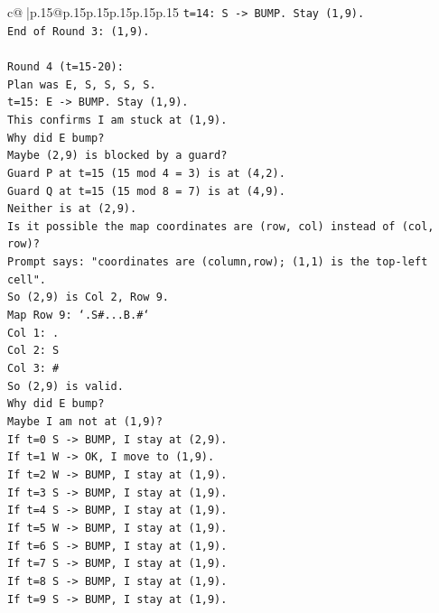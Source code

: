 \documentclass{article}
\begin{document}
{\begin{supertabular}{c@{$\;$}|p{.15\linewidth}@{}p{.15\linewidth}p{.15\linewidth}p{.15\linewidth}p{.15\linewidth}p{.15\linewidth}}
{{{\texttt{t=14: S {-}> BUMP. Stay (1,9).} \\
\texttt{End of Round 3: (1,9).} \\
\\ 
\texttt{Round 4 (t=15{-}20):} \\
\texttt{Plan was E, S, S, S, S.} \\
\texttt{t=15: E {-}> BUMP. Stay (1,9).} \\
\texttt{This confirms I am stuck at (1,9).} \\
\texttt{Why did E bump?} \\
\texttt{Maybe (2,9) is blocked by a guard?} \\
\texttt{Guard P at t=15 (15 mod 4 = 3) is at (4,2).} \\
\texttt{Guard Q at t=15 (15 mod 8 = 7) is at (4,9).} \\
\texttt{Neither is at (2,9).} \\
\texttt{Is it possible the map coordinates are (row, col) instead of (col, row)?} \\
\texttt{Prompt says: "coordinates are (column,row); (1,1) is the top{-}left cell".} \\
\texttt{So (2,9) is Col 2, Row 9.} \\
\texttt{Map Row 9: `.S\#...B.\#`} \\
\texttt{Col 1: .} \\
\texttt{Col 2: S} \\
\texttt{Col 3: \#} \\
\texttt{So (2,9) is valid.} \\
\texttt{Why did E bump?} \\
\texttt{Maybe I am not at (1,9)?} \\
\texttt{If t=0 S {-}> BUMP, I stay at (2,9).} \\
\texttt{If t=1 W {-}> OK, I move to (1,9).} \\
\texttt{If t=2 W {-}> BUMP, I stay at (1,9).} \\
\texttt{If t=3 S {-}> BUMP, I stay at (1,9).} \\
\texttt{If t=4 S {-}> BUMP, I stay at (1,9).} \\
\texttt{If t=5 W {-}> BUMP, I stay at (1,9).} \\
\texttt{If t=6 S {-}> BUMP, I stay at (1,9).} \\
\texttt{If t=7 S {-}> BUMP, I stay at (1,9).} \\
\texttt{If t=8 S {-}> BUMP, I stay at (1,9).} \\
\texttt{If t=9 S {-}> BUMP, I stay at (1,9).} \\
}}}
\end{supertabular}}
\end{document}
